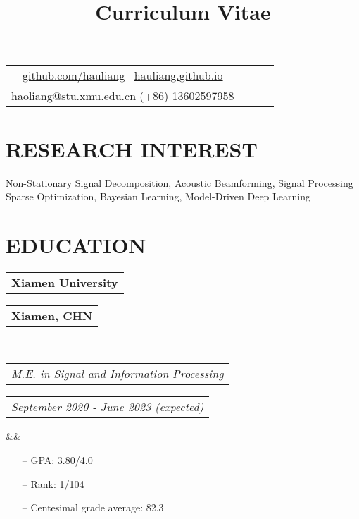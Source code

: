 \documentclass[11pt,a4paper,roman]{moderncv}        %
\title{Curriculum Vitae}
\makeatletter
\newcommand*{\customcventry}[7][.25em]{
	\begin{tabular}{@{}l} 
		{\bfseries #4}
	\end{tabular}
	\hfill%
	\begin{tabular}{l@{}}
		{\bfseries #5}
	\end{tabular} \\
	\begin{tabular}{@{}l} 
		{\itshape #3}
	\end{tabular}
	\hfill%
	\begin{tabular}{l@{}}
		{\itshape #2}
	\end{tabular}
	\ifx&#7&%
	\else{\\%
		\begin{minipage}{\maincolumnwidth}%
			\small#7%
	\end{minipage}}\fi%
	\par\addvspace{#1}}
\makeatother
\begin{document}
	\makecvtitle
	\vspace*{-16mm}
	
	\begin{center}
		\renewcommand{\arraystretch}{1.3}
		\begin{tabular}{ c c c c }
			\faGithub\enspace \href{https://github.com/HauLiang}{github.com/hauliang} \  \enspace \faGlobe\enspace \href{hauliang.github.io}{hauliang.github.io}  \\
			\faEnvelopeO\enspace haoliang@stu.xmu.edu.cn \enspace  \enspace \faMobile\enspace (+86) 13602597958 \\
		\end{tabular}
	\end{center}
	
	\vspace*{-2.5mm}
	

	\cfoot{\vspace{-2mm}{\color{gray} \rule[-10pt]{14.3cm}{0.05em}} \vspace{2mm}\\ \emph{\textcolor{gray}{Last Updated by: 2022/10/27}}}
	
	\section{RESEARCH INTEREST}
	Non-Stationary Signal Decomposition, Acoustic Beamforming, Signal Processing \\
	Sparse Optimization, Bayesian Learning, Model-Driven Deep Learning
	
	\section{EDUCATION}
	{\customcventry{September 2020 - June 2023 (expected)}{M.E. in Signal and Information Processing }{Xiamen University}{Xiamen, CHN}{}{}}
	
	\begin{itemize}
		\item[--] GPA: 3.80/4.0  
		\item[--] Rank: 1/104
		\item[--] Centesimal grade average: 82.3 
	\end{itemize}
	\vspace{2mm}
	
\end{document}
